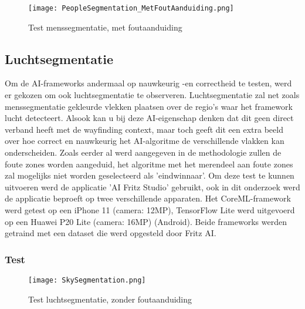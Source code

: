 \begin{figure}[H]
	\centering
	\texttt{[image: PeopleSegmentation\_MetFoutAanduiding.png]}
	\caption{Test menssegmentatie, met foutaanduiding}
\end{figure}

\subsection{Luchtsegmentatie}
Om de AI-frameworks andermaal op nauwkeurig -en correctheid te testen, werd er gekozen om ook luchtsegmentatie te observeren. Luchtsegmentatie zal net zoals menssegmentatie gekleurde vlekken plaatsen over de regio's waar het framework lucht detecteert. Alsook kan u bij deze AI-eigenschap denken dat dit geen direct verband heeft met de wayfinding context, maar toch geeft dit een extra beeld over hoe correct en nauwkeurig het AI-algoritme de verschillende vlakken kan onderscheiden. Zoals eerder al werd aangegeven in de methodologie zullen de foute zones worden aangeduid, het algoritme met het merendeel aan foute zones zal mogelijks niet worden geselecteerd als 'eindwinnaar'. Om deze test te kunnen uitvoeren werd de applicatie 'AI Fritz Studio' gebruikt, ook in dit onderzoek werd de applicatie beproeft op twee verschillende apparaten. Het CoreML-framework werd getest op een iPhone 11 (camera: 12MP), TensorFlow Lite werd uitgevoerd op een Huawei P20 Lite (camera: 16MP) (Android). Beide frameworks werden getraind met een dataset die werd opgesteld door Fritz AI.

\newpage
\subsubsection{Test}
\begin{figure}[H]
	\centering
	\texttt{[image: SkySegmentation.png]}
	\caption{Test luchtsegmentatie, zonder foutaanduiding}
\end{figure}

